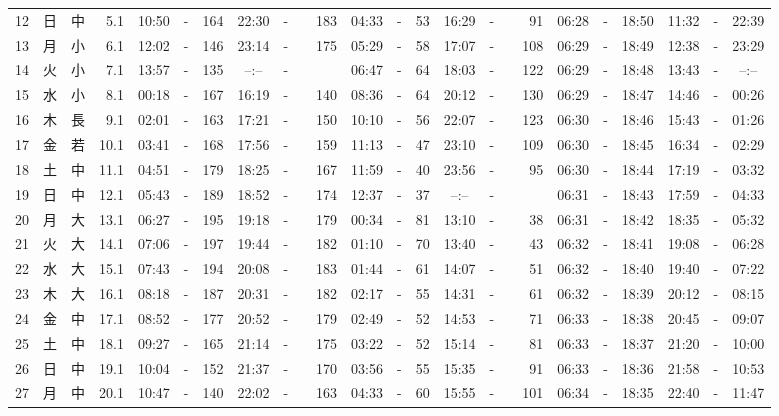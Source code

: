 \documentclass[12pt,a4j]{jsarticle}
\begin{document}
\begin{table}[htbp]
\begin{center}
{\begin{tabular}{|rc|cr|ccrccr|ccrccr|ccc|ccc|}
12 & 日 & 中 &  5.1 &  10:50 &-& 164 &  22:30 &-& 183 &  04:33 &-&  53 &  16:29 &-&  91 & 06:28 & -& 18:50 & 11:32 & -& 22:39 \\
13 & 月 & 小 &  6.1 &  12:02 &-& 146 &  23:14 &-& 175 &  05:29 &-&  58 &  17:07 &-& 108 & 06:29 & -& 18:49 & 12:38 & -& 23:29 \\
14 & 火 & 小 &  7.1 &  13:57 &-& 135 &  --:-- &-&~~~~~ &  06:47 &-&  64 &  18:03 &-& 122 & 06:29 & -& 18:48 & 13:43 & -& --:-- \\
15 & 水 & 小 &  8.1 &  00:18 &-& 167 &  16:19 &-& 140 &  08:36 &-&  64 &  20:12 &-& 130 & 06:29 & -& 18:47 & 14:46 & -& 00:26 \\
16 & 木 & 長 &  9.1 &  02:01 &-& 163 &  17:21 &-& 150 &  10:10 &-&  56 &  22:07 &-& 123 & 06:30 & -& 18:46 & 15:43 & -& 01:26 \\
17 & 金 & 若 & 10.1 &  03:41 &-& 168 &  17:56 &-& 159 &  11:13 &-&  47 &  23:10 &-& 109 & 06:30 & -& 18:45 & 16:34 & -& 02:29 \\
18 & 土 & 中 & 11.1 &  04:51 &-& 179 &  18:25 &-& 167 &  11:59 &-&  40 &  23:56 &-&  95 & 06:30 & -& 18:44 & 17:19 & -& 03:32 \\
19 & 日 & 中 & 12.1 &  05:43 &-& 189 &  18:52 &-& 174 &  12:37 &-&  37 &  --:-- &-&~~~~~ & 06:31 & -& 18:43 & 17:59 & -& 04:33 \\
20 & 月 & 大 & 13.1 &  06:27 &-& 195 &  19:18 &-& 179 &  00:34 &-&  81 &  13:10 &-&  38 & 06:31 & -& 18:42 & 18:35 & -& 05:32 \\
21 & 火 & 大 & 14.1 &  07:06 &-& 197 &  19:44 &-& 182 &  01:10 &-&  70 &  13:40 &-&  43 & 06:32 & -& 18:41 & 19:08 & -& 06:28 \\
22 & 水 & 大 & 15.1 &  07:43 &-& 194 &  20:08 &-& 183 &  01:44 &-&  61 &  14:07 &-&  51 & 06:32 & -& 18:40 & 19:40 & -& 07:22 \\
23 & 木 & 大 & 16.1 &  08:18 &-& 187 &  20:31 &-& 182 &  02:17 &-&  55 &  14:31 &-&  61 & 06:32 & -& 18:39 & 20:12 & -& 08:15 \\
24 & 金 & 中 & 17.1 &  08:52 &-& 177 &  20:52 &-& 179 &  02:49 &-&  52 &  14:53 &-&  71 & 06:33 & -& 18:38 & 20:45 & -& 09:07 \\
25 & 土 & 中 & 18.1 &  09:27 &-& 165 &  21:14 &-& 175 &  03:22 &-&  52 &  15:14 &-&  81 & 06:33 & -& 18:37 & 21:20 & -& 10:00 \\
26 & 日 & 中 & 19.1 &  10:04 &-& 152 &  21:37 &-& 170 &  03:56 &-&  55 &  15:35 &-&  91 & 06:33 & -& 18:36 & 21:58 & -& 10:53 \\
27 & 月 & 中 & 20.1 &  10:47 &-& 140 &  22:02 &-& 163 &  04:33 &-&  60 &  15:55 &-& 101 & 06:34 & -& 18:35 & 22:40 & -& 11:47 \\

\end{tabular}}
\end{center}
\end{table}
\end{document}
